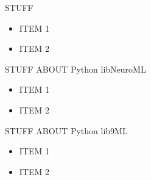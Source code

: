 \begin{multicols}{3}
STUFF

\begin{itemize}[nolistsep,topsep=0em,leftmargin=1pc]
\item ITEM 1
\item ITEM 2
\end{itemize}

%


STUFF ABOUT Python libNeuroML

\begin{itemize}[nolistsep,topsep=0em,leftmargin=1pc]
\item ITEM 1
\item ITEM 2
\end{itemize}


STUFF ABOUT Python lib9ML

\begin{itemize}[nolistsep,topsep=0em,leftmargin=1pc]
\item ITEM 1
\item ITEM 2
\end{itemize}

\end{multicols}


